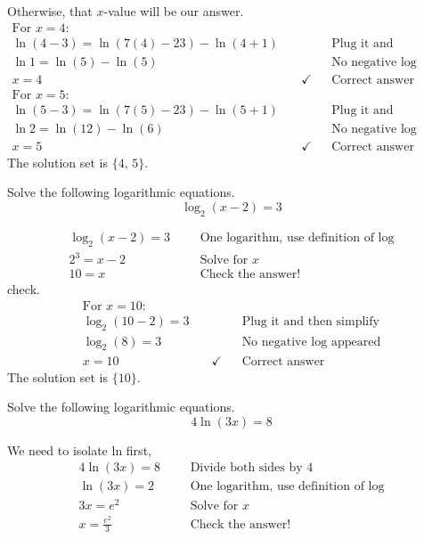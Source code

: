 Otherwise, that $x$-value will be our answer. 
	\begin{align*}
		\text{For}\,\, x=4:  \qquad \qquad&\\
		\ln{(4-3)} =\ln{(7(4)-23)}-\ln{(4+1)}& &&\text{Plug it and then simplify} \\
		\ln{1}=\ln{(5)}-\ln{(5)}&				&&\text{No negative log appeared}\\
		x=4& \quad \checkmark					&&\text{Correct answer}
		&&&\\
		\text{For}\,\, x=5: \qquad \qquad&  \\
		\ln{(5-3)}=\ln{(7(5)-23)}-\ln{(5+1)}& &&\text{Plug it and then simplify} \\
		\ln{2}=\ln{(12)}-\ln{(6)}&			&&\text{No negative log appeared}\\
		x=5& \quad \checkmark					&&\text{Correct answer}		
	\end{align*}
The solution set is $\{4,\, 5\}$.	
\begin{exa}
    Solve the following logarithmic equations. 
    \[
               \log_{2}(x-2) =3
    \]
\end{exa}
	\begin{align*}
		\log_{2}(x-2) =3&		&&\text{One logarithm, use definition of log}\\
		2^3 = x-2&				&&\text{Solve for $x$}\\
		10 = x&					&&\text{Check the answer!}
	\end{align*}
check.	
	\begin{align*}
		\text{For}\,\, x=10:  \\
		\log_{2}(10-2) =3& 			&&\text{Plug it and then simplify} \\
		\log_{2}(8) =3& 				&&\text{No negative log appeared}\\
		x=10& \quad \checkmark		&&\text{Correct answer}
	\end{align*}
The solution set is $\{10\}$.	
\begin{exa}
    Solve the following logarithmic equations. 
    \[
                4\ln{(3x)} =8
    \]
\end{exa}
We need to isolate ln first,
	\begin{align*}
		4\ln{(3x)} =8&		&&\text{Divide both sides by 4}\\
		\ln{(3x)}  =2&			&&\text{One logarithm, use definition of log}\\
		3x = e^2&				&&\text{Solve for $x$}\\
		x= \frac{e^2}{3}&		&&\text{Check the answer!}
	\end{align*}
